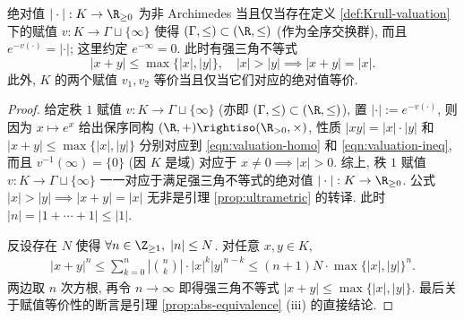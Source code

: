 \begin{proposition}\label{prop:abs-valuation}
	绝对值 $|\cdot|: K \to \R_{\geq 0}$ 为非 Archimedes 当且仅当存在定义 \ref{def:Krull-valuation} 下的赋值 $v: K \to \Gamma \sqcup \{\infty\}$ 使得 $(\Gamma, \leq) \subset (\R, \leq)$ (作为全序交换群), 而且 $e^{-v(\cdot)} = |\cdot|$; 这里约定 $e^{-\infty}=0$. 此时有强三角不等式
	\[ |x+y| \leq \max\{ |x|, |y| \}, \quad |x|>|y| \implies |x+y|=|x|. \]
	此外, $K$ 的两个赋值 $v_1, v_2$ 等价当且仅当它们对应的绝对值等价.
\end{proposition}
\begin{proof}
	给定秩 $1$ 赋值 $v: K \to \Gamma \sqcup\{\infty\}$ (亦即 $(\Gamma, \leq) \subset (\R, \leq)$), 置 $|\cdot| := e^{-v(\cdot)}$, 则因为 $x \mapsto e^x$ 给出保序同构 $(\R, +) \rightiso (\R_{>0}, \times)$, 性质 $|xy|=|x| \cdot |y|$ 和 $|x+y| \leq \max\{|x|,|y|\}$ 分别对应到 \eqref{eqn:valuation-homo} 和 \eqref{eqn:valuation-ineq}, 而且 $v^{-1}(\infty)=\{0\}$ (因 $K$ 是域) 对应于 $x \neq 0 \implies |x| > 0$. 综上, 秩 $1$ 赋值 $v: K \to \Gamma \sqcup \{\infty\}$ 一一对应于满足强三角不等式的绝对值 $|\cdot|: K \to \R_{\geq 0}$. 公式 $|x|>|y| \implies |x+y|=|x|$ 无非是引理 \ref{prop:ultrametric} 的转译. 此时 $|n| = |1+ \cdots + 1| \leq |1|$.
	
	反设存在 $N$ 使得 $\forall n \in \Z_{\geq 1}, \; |n| \leq N$. 对任意 $x,y \in K$,
	\begin{gather*}
		|x+y|^n \leq \sum_{k=0}^n \left| \binom{n}{k}  \right| \cdot |x|^k |y|^{n-k} \leq (n+1)N \cdot \max\{|x|,|y|\}^n.
	\end{gather*}
	两边取 $n$ 次方根, 再令 $n \to \infty$ 即得强三角不等式 $|x+y| \leq \max\{|x|,|y|\}$. 最后关于赋值等价性的断言是引理 \ref{prop:abs-equivalence} (iii) 的直接结论.
\end{proof}

